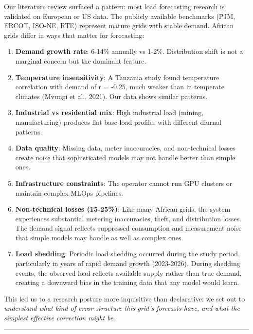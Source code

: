Our literature review surfaced a pattern: most load forecasting research
is validated on European or US data. The publicly available benchmarks
(PJM, ERCOT, ISO-NE, RTE) represent mature grids with stable demand.
African grids differ in ways that matter for forecasting:

\begin{enumerate}
\def\labelenumi{\arabic{enumi}.}
\tightlist
\item
  \textbf{Demand growth rate}: 6-14\% annually vs 1-2\%. Distribution
  shift is not a marginal concern but the dominant feature.
\item
  \textbf{Temperature insensitivity}: A Tanzania study found temperature
  correlation with demand of r = -0.25, much weaker than in temperate
  climates (Mvungi et al., 2021). Our data shows similar patterns.
\item
  \textbf{Industrial vs residential mix}: High industrial load (mining,
  manufacturing) produces flat base-load profiles with different diurnal
  patterns.
\item
  \textbf{Data quality}: Missing data, meter inaccuracies, and
  non-technical losses create noise that sophisticated models may not
  handle better than simple ones.
\item
  \textbf{Infrastructure constraints}: The operator cannot run GPU
  clusters or maintain complex MLOps pipelines.
\item
  \textbf{Non-technical losses (15-25\%)}: Like many African grids, the
  system experiences substantial metering inaccuracies, theft, and
  distribution losses. The demand signal reflects suppressed consumption
  and measurement noise that simple models may handle as well as complex
  ones.
\item
  \textbf{Load shedding}: Periodic load shedding occurred during the
  study period, particularly in years of rapid demand growth
  (2023-2026). During shedding events, the observed load reflects
  available supply rather than true demand, creating a downward bias in
  the training data that any model would learn.
\end{enumerate}

This led us to a research posture more inquisitive than declarative: we
set out to \emph{understand what kind of error structure this grid's
forecasts have, and what the simplest effective correction might be.}

\begin{center}\rule{0.5\linewidth}{0.5pt}\end{center}

